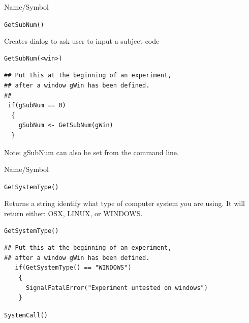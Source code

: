 \begin{desc}{Name/Symbol}
\item[Name/Symbol]	\verb+GetSubNum()+

\item[Description]	Creates dialog to ask user to input a subject code

\item[Usage]
\begin{verbatim}
GetSubNum(<win>)
\end{verbatim}

\item[Example]

\begin{verbatim}
## Put this at the beginning of an experiment, 
## after a window gWin has been defined.
##
 if(gSubNum == 0)
  {
    gSubNum <- GetSubNum(gWin)
  }
\end{verbatim}
Note: gSubNum can also be set from the command line.
\item[See Also]
\end{desc}

\begin{desc}{Name/Symbol}
\item[Name/Symbol]	\verb+GetSystemType()+

\item[Description]	Returns a string identify what type of computer system you are using. It will return either: OSX, LINUX, or WINDOWS.

\item[Usage]
\begin{verbatim}
GetSystemType()
\end{verbatim}

\item[Example]

\begin{verbatim}
## Put this at the beginning of an experiment, 
## after a window gWin has been defined.
   if(GetSystemType() == "WINDOWS")
    {
      SignalFatalError("Experiment untested on windows")
    }

\end{verbatim}

\item[See Also]
  \verb+SystemCall()+
\end{desc}



